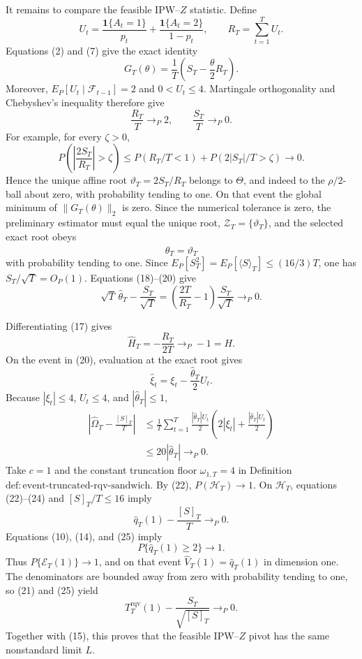 It remains to compare the feasible IPW--\(Z\) statistic.  Define
\[
U_t=\frac{\mathbf1\{A_t=1\}}{p_t}
+\frac{\mathbf1\{A_t=2\}}{1-p_t},
\qquad R_T=\sum_{t=1}^TU_t.
\]
Equations (2) and (7) give the exact identity
\[
G_T(\theta)=\frac1T\left(S_T-\frac\theta2R_T\right).
\tag{17}
\]
Moreover, \(E_P[U_t\mid\mathcal F_{t-1}]=2\) and \(0<U_t\le4\).  Martingale orthogonality and Chebyshev's inequality therefore give
\[
\frac{R_T}{T}\to_P2,
\qquad
\frac{S_T}{T}\to_P0.
\tag{18}
\]
For example, for every \(\zeta>0\),
\[
P\!\left(\left|\frac{2S_T}{R_T}\right|>\zeta\right)
\le P(R_T/T<1)+P(2|S_T|/T>\zeta)\longrightarrow0.
\tag{19}
\]
Hence the unique affine root \(\vartheta_T=2S_T/R_T\) belongs to \(\Theta\), and indeed to the \(\rho/2\)-ball about zero, with probability tending to one.  On that event the global minimum of \(\lVert G_T(\theta)\rVert_2\) is zero.  Since the numerical tolerance is zero, the preliminary estimator must equal the unique root, \(\mathcal Z_T=\{\vartheta_T\}\), and the selected exact root obeys
\[
\widehat\theta_T=\vartheta_T
\tag{20}
\]
with probability tending to one.  Since \(E_P[S_T^2]=E_P[\langle S\rangle_T]\le(16/3)T\), one has \(S_T/\sqrt T=O_P(1)\).  Equations (18)--(20) give
\[
\sqrt T\,\widehat\theta_T-\frac{S_T}{\sqrt T}
=\left(\frac{2T}{R_T}-1\right)\frac{S_T}{\sqrt T}
\to_P0.
\tag{21}
\]

Differentiating (17) gives
\[
\widehat H_T=-\frac{R_T}{2T}\to_P-1=H.
\tag{22}
\]
On the event in (20), evaluation at the exact root gives
\[
\widehat\xi_t=\xi_t-\frac{\widehat\theta_T}{2}U_t.
\tag{23}
\]
Because \(|\xi_t|\le4\), \(U_t\le4\), and \(|\widehat\theta_T|\le1\),
\[
\begin{aligned}
\left|\widehat\Omega_T-\frac{[S]_T}{T}\right|
&\le\frac1T\sum_{t=1}^T
\frac{|\widehat\theta_T|U_t}{2}
\left(2|\xi_t|+\frac{|\widehat\theta_T|U_t}{2}\right)\\
&\le20|\widehat\theta_T|\to_P0.
\end{aligned}
\tag{24}
\]
Take \(c=1\) and the constant truncation floor \(\omega_{1,T}=4\) in Definition~\(\mathrm{def:event\text{-}truncated\text{-}rqv\text{-}sandwich}\).  By (22), \(P(\mathcal H_T)\to1\).  On \(\mathcal H_T\), equations (22)--(24) and \([S]_T/T\le16\) imply
\[
\widehat q_T(1)-\frac{[S]_T}{T}\to_P0.
\tag{25}
\]
Equations (10), (14), and (25) imply
\[
P\{\widehat q_T(1)\ge2\}\longrightarrow1.
\tag{26}
\]
Thus \(P\{\mathcal E_T(1)\}\to1\), and on that event \(\widehat V_T(1)=\widehat q_T(1)\) in dimension one.  The denominators are bounded away from zero with probability tending to one, so (21) and (25) yield
\[
T_T^{\mathrm{rqv}}(1)-\frac{S_T}{\sqrt{[S]_T}}\to_P0.
\tag{27}
\]
Together with (15), this proves that the feasible IPW--\(Z\) pivot has the same nonstandard limit \(L\).

